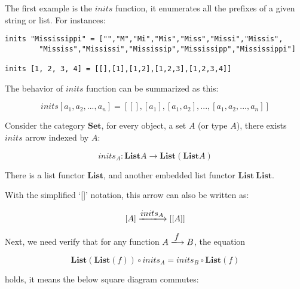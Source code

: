 \documentclass{article}
\begin{document}
\begin{example}
\normalfont
The first example is the $inits$ function, it enumerates all the prefixes of a given string or list. For instances:

\lstset{frame=none}
\begin{lstlisting}
inits "Mississippi" = ["","M","Mi","Mis","Miss","Missi","Missis",
        "Mississ","Mississi","Mississip","Mississipp","Mississippi"]

inits [1, 2, 3, 4] = [[],[1],[1,2],[1,2,3],[1,2,3,4]]
\end{lstlisting}

The behavior of $inits$ function can be summarized as this:

\[
inits [a_1, a_2, ..., a_n] = [[], [a_1], [a_1, a_2], ..., [a_1, a_2, ..., a_n]]
\]

Consider the category $\pmb{Set}$, for every object, a set $A$ (or type $A$), there exists $inits$ arrow indexed by $A$:

\[
inits_A : \mathbf{List} A \to \mathbf{List}(\mathbf{List} A)
\]

There is a list functor $\mathbf{List}$, and another embedded list functor $\mathbf{List}\ \mathbf{List}$.

With the simplified `[]' notation, this arrow can also be written as:

\[
[A] \arrowto{inits_A} [[A]]
\]

Next, we need verify that for any function $A \arrowto{f} B$, the equation

\[
\mathbf{List}(\mathbf{List}(f)) \circ inits_A = inits_B \circ \mathbf{List}(f)
\]

holds, it means the below square diagram commutes:

\begin{center}
\end{center}


\end{example}
\end{document}
